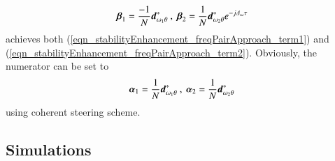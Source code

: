 \else
\fi
\begin{equation}
    \label{eqn_stabilityEnhancement_freqPairApproach_betaOpt}
    \vecnot{\beta}_{1} = \frac{-1}{N}\vecnot{d}^{*}_{\omega_{1}\theta} 
    \ ,\ 
    \vecnot{\beta}_{2} = \frac{1}{N}\vecnot{d}^{*}_{\omega_{2}\theta}e^{-j\Delta_{\omega}\tau}
\end{equation}
achieves both (\ref{eqn_stabilityEnhancement_freqPairApproach_term1}) and (\ref{eqn_stabilityEnhancement_freqPairApproach_term2}).
Obviously, the numerator can be set to 
\begin{equation*}
    \vecnot{\alpha}_{1} = \frac{1}{N}\vecnot{d}^{*}_{\omega_{1}\theta} 
    \ ,\ 
    \vecnot{\alpha}_{2} = \frac{1}{N}\vecnot{d}^{*}_{\omega_{2}\theta}
\end{equation*}
using coherent steering scheme. 
\subsection*{Simulations}